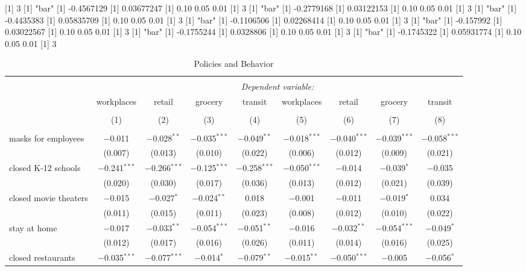 [1] 3
[1] "bar"
[1] -0.4567129
[1] 0.03677247
[1] 0.10 0.05 0.01
[1] 3
[1] "bar"
[1] -0.2779168
[1] 0.03122153
[1] 0.10 0.05 0.01
[1] 3
[1] "bar"
[1] -0.4435383
[1] 0.05835709
[1] 0.10 0.05 0.01
[1] 3
[1] "bar"
[1] -0.1106506
[1] 0.02268414
[1] 0.10 0.05 0.01
[1] 3
[1] "bar"
[1] -0.157992
[1] 0.03022567
[1] 0.10 0.05 0.01
[1] 3
[1] "bar"
[1] -0.1755244
[1] 0.0328806
[1] 0.10 0.05 0.01
[1] 3
[1] "bar"
[1] -0.1745322
[1] 0.05931774
[1] 0.10 0.05 0.01
[1] 3

\begin{table}[!htbp] \centering 
  \caption{Policies and Behavior} 
  \label{} 
\begin{tabular}{@{\extracolsep{1pt}}lcccccccc} 
\\[-1.8ex]\hline 
\hline \\[-1.8ex] 
 & \multicolumn{8}{c}{\textit{Dependent variable:}} \\ 
\cline{2-9} 
 & workplaces & retail & grocery & transit & workplaces & retail & grocery & transit \\ 
\\[-1.8ex] & (1) & (2) & (3) & (4) & (5) & (6) & (7) & (8)\\ 
\hline \\[-1.8ex] 
 masks for employees & $-$0.011 & $-$0.028$^{**}$ & $-$0.035$^{***}$ & $-$0.049$^{**}$ & $-$0.018$^{***}$ & $-$0.040$^{***}$ & $-$0.039$^{***}$ & $-$0.058$^{***}$ \\ 
  & (0.007) & (0.013) & (0.010) & (0.022) & (0.006) & (0.012) & (0.009) & (0.021) \\ 
  closed K-12 schools & $-$0.241$^{***}$ & $-$0.266$^{***}$ & $-$0.125$^{***}$ & $-$0.258$^{***}$ & $-$0.050$^{***}$ & $-$0.014 & $-$0.039$^{*}$ & $-$0.035 \\ 
  & (0.020) & (0.030) & (0.017) & (0.036) & (0.013) & (0.012) & (0.021) & (0.039) \\ 
  closed movie theaters & $-$0.015 & $-$0.027$^{*}$ & $-$0.024$^{**}$ & 0.018 & $-$0.001 & $-$0.011 & $-$0.019$^{*}$ & 0.034 \\ 
  & (0.011) & (0.015) & (0.011) & (0.023) & (0.008) & (0.012) & (0.010) & (0.022) \\ 
  stay at home & $-$0.017 & $-$0.033$^{**}$ & $-$0.054$^{***}$ & $-$0.051$^{**}$ & $-$0.016 & $-$0.032$^{**}$ & $-$0.054$^{***}$ & $-$0.049$^{*}$ \\ 
  & (0.012) & (0.017) & (0.016) & (0.026) & (0.011) & (0.014) & (0.016) & (0.025) \\ 
  closed restaurants & $-$0.035$^{***}$ & $-$0.077$^{***}$ & $-$0.014$^{*}$ & $-$0.079$^{**}$ & $-$0.015$^{**}$ & $-$0.050$^{***}$ & $-$0.005 & $-$0.056$^{*}$ \\ 

\end{tabular}
\end{table}
